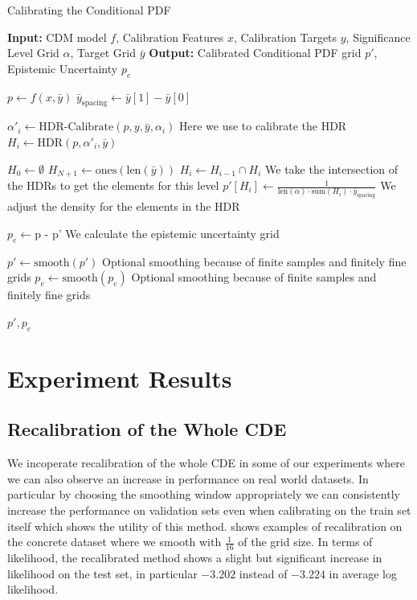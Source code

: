 \begin{algorithm}
    \caption{Calibrating the Conditional PDF}
    \label{alg:calibrate_pdf}
    \begin{algorithmic}
        \STATE \textbf{Input:} CDM model $f$, Calibration Features $x$, Calibration Targets $y$, Significance Level Grid $\alpha$, Target Grid $\bar{y}$
        \STATE \textbf{Output:} Calibrated Conditional PDF grid $p'$, Epistemic Uncertainty $p_e$

        \STATE $p \leftarrow f(x, \bar{y})$
        \STATE $\bar{y}_{\text{spacing}} \leftarrow \bar{y}[1] - \bar{y}[0]$

        \STATE $\alpha'_i \leftarrow \text{HDR-Calibrate}(p, y, \bar{y}, \alpha_i)$ Here we use  to calibrate the HDR
        \STATE $H_i \leftarrow \text{HDR}(p, \alpha'_i, \bar{y})$
        \ENDFOR

        \STATE $H_0 \leftarrow \emptyset$
        \STATE $H_{N+1} \leftarrow \text{ones}(\text{len}(\bar{y}))$
        \STATE $H_i \leftarrow H_{i - 1} \cap H_i$ We take the intersection of the HDRs to get the elements for this level
        \STATE $p'[H_i] \leftarrow \frac{1}{\text{len}(\alpha) \cdot \text{sum}(H_i) \cdot \bar{y}_{\text{spacing}}}$ We adjust the density for the elements in the HDR
        \ENDFOR

        \STATE $p_e \leftarrow \text{p - p'}$ We calculate the epistemic uncertainty grid

        \STATE $p' \leftarrow \text{smooth}(p')$ Optional smoothing because of finite samples and finitely fine grids
        \STATE $p_e \leftarrow \text{smooth}(p_e)$ Optional smoothing because of finite samples and finitely fine grids

        \RETURN $p', p_e$
    \end{algorithmic}
\end{algorithm}

\section{Experiment Results} \label{sec:results}

\subsection{Recalibration of the Whole CDE}

We incoperate recalibration of the whole CDE in some of our experiments where we can also observe an increase in performance on real world datasets. In particular by choosing the smoothing window appropriately we can consistently increase the performance on validation sets even when calibrating on the train set itself which shows the utility of this method.  shows examples of recalibration on the concrete dataset where we smooth with $\frac{1}{16}$ of the grid size. In terms of likelihood, the recalibrated method shows a slight but significant increase in likelihood on the test set, in particular $-3.202$ instead of $-3.224$ in average log likelihood. %

